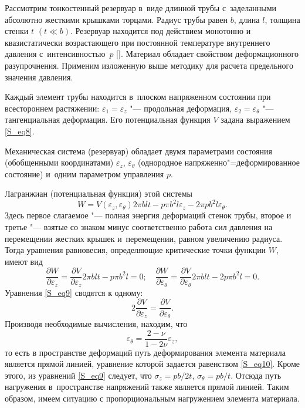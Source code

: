 \smallskip


 Рассмотрим тонкостенный резервуар в~виде длинной трубы с~заделанными абсолютно жесткими крышками торцами. 
Радиус трубы равен $ b $, длина $ l $, толщина стенки $ t$  $(t\ll b)$. 
Резервуар находится под действием  монотонно и квазистатически возрастающего при постоянной температуре внутреннего давления с~интенсивностью~$ p $ []. 
Материал обладает свойством деформационного разупрочнения. 
Применим изложенную выше методику для расчета предельного значения давления. 

Каждый элемент трубы находится в~плоском напряженном состоянии при всестороннем растяжении: 
$ \varepsilon_1 = \varepsilon_z $ "--- продольная деформация, 
$ \varepsilon_2 = \varepsilon_{\theta} $ "--- тангенциальная деформация. Его потенциальная функция $ V $ задана выражением \eqref{S_eq8}. 

Механическая система (резервуар) обладает двумя параметрами состояния (обобщенными координатами) $ \varepsilon_z$, $\varepsilon_{\theta} $ (однородное напряженно"=деформированное состояние) и~одним параметром управления $ p $. 

Лагранжиан (потенциальная функция) этой системы
$$
W = V(\varepsilon_z , \varepsilon_{\theta})2\pi b l t - p \pi b^2 l \varepsilon_z - 2\pi p b^2 l \varepsilon_{\theta}.
$$
Здесь первое слагаемое "--- полная энергия деформаций стенок трубы, второе и третье "--- взятые со знаком минус соответственно работа сил давления на перемещении жестких крышек и~перемещении, равном увеличению радиуса. 
Тогда уравнения равновесия, определяющие критические точки функции $ W $, имеют вид
\begin{equation}\label{S_eq9}
\frac{\partial W}{\partial \varepsilon_z} = \frac{\partial V}{\partial \varepsilon_z} 2\pi b l t  - p \pi b^2 l = 0;
\quad  
\frac{\partial W}{\partial \varepsilon_{\theta}} = \frac{\partial V}{\partial \varepsilon_{\theta}} 2\pi b l t  - 2p \pi b^2 l = 0.
\end{equation}
Уравнения \eqref{S_eq9} сводятся к одному:
$$
2 \frac{\partial V}{\partial \varepsilon_z} = \frac{\partial V}{\partial \varepsilon_{\theta}}.
$$
Производя необходимые вычисления, находим, что
\begin{equation}\label{S_eq10}
\varepsilon_{\theta} = \frac{2-\nu}{1-2\nu} \varepsilon_{z},
\end{equation}
то есть в пространстве деформаций путь деформирования элемента материала является прямой линией, уравнение которой задается равенством \eqref{S_eq10}. 
Кроме этого, из уравнений \eqref{S_eq9} следует, что  $ \sigma_z = pb/2t$, $\sigma_{\theta} = pb/t $. 
Отсюда путь нагружения в~пространстве напряжений также является прямой линией. 
Таким образом, имеем ситуацию с пропорциональным нагружением элемента материала.

